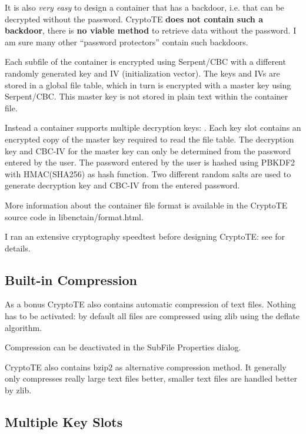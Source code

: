 \documentclass[a4paper,12pt,twoside,draft]{article}
\begin{document}
It is also \emph{very easy} to design a container that has a backdoor, i.e. that can be decrypted without the password. CryptoTE \textbf{does not contain such a backdoor}, there is \textbf{no viable method} to retrieve data without the password. I am sure many other ``password protectors'' contain such backdoors.

Each subfile of the container is encrypted using Serpent/CBC with a different randomly generated key and IV (initialization vector). The keys and IVs are stored in a global file table, which in turn is encrypted with a master key using Serpent/CBC. This master key is not stored in plain text within the container file.

Instead a container supports multiple decryption keys: . Each key slot contains an encrypted copy of the master key required to read the file table. The decryption key and CBC-IV for the master key can only be determined from the password entered by the user. The password entered by the user is hashed using PBKDF2 with HMAC(SHA256) as hash function. Two different random salts are used to generate decryption key and CBC-IV from the entered password.

More information about the container file format is available in the CryptoTE source code in libenctain/format.html.

I ran an extensive cryptography speedtest before designing CryptoTE: see  for details.

\subsection{Built-in Compression}\label{Compression}

As a bonus CryptoTE also contains automatic compression of text files. Nothing has to be activated: by default all files are compressed using zlib using the deflate algorithm.

Compression can be deactivated in the SubFile Properties dialog.

CryptoTE also contains bzip2 as alternative compression method. It generally only compresses really large text files better, smaller text files are handled better by zlib.

\subsection{Multiple Key Slots}\label{KeySlots}
\end{document}
